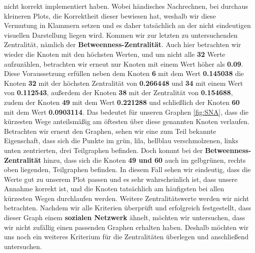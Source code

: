 nicht korrekt implementiert haben. Wobei händisches Nachrechnen, bei durchaus kleineren Plots, die Korrektheit dieser bewiesen hat, weshalb wir diese Vermutung in Klammern setzen und es daher tatsächlich an der nicht eindeutigen visuellen Darstellung liegen wird. Kommen wir zur letzten zu untersuchenden Zentralität, nämlich der \textbf{Betweenness-Zentralität}. Auch hier betrachten wir wieder die Knoten mit den höchsten Werten, und um nicht alle \textbf{32} Werte aufzuzählen, betrachten wir erneut nur Knoten mit einem Wert höher als \textbf{0.09}. Diese Voraussetzung erfüllen neben dem Knoten \textbf{6} mit dem Wert \textbf{0.145038} die Knoten \textbf{32} mit der höchsten Zentralität von \textbf{0.266448} und \textbf{34} mit einem Wert von \textbf{0.112543}, außerdem der Knoten \textbf{38} mit der Zentralität von \textbf{0.154688}, zudem der Knoten \textbf{49} mit dem Wert \textbf{0.221288} und schließlich der Knoten \textbf{60} mit dem Wert \textbf{0.0903114}. Das bedeutet für unseren Graphen \ref{fig:SNA}, dass die kürzesten Wege anteilsmäßig am öftesten über diese genannten Knoten verlaufen. Betrachten wir erneut den Graphen, sehen wir eine zum Teil bekannte Eigenschaft, dass sich die Punkte im grün, lila, hellblau verschmolzenen, links unten zentrierten, drei Teilgraphen befinden. Doch kommt bei der \textbf{Betweenness-Zentralität} hinzu, dass sich die Knoten \textbf{49 und 60} auch im gelbgrünen, rechts oben liegenden, Teilgraphen befinden. In diesem Fall sehen wir eindeutig, dass die Werte gut zu unserem Plot passen und es sehr wahrscheinlich ist, dass unsere Annahme korrekt ist, und die Knoten tatsächlich am häufigsten bei allen kürzesten Wegen durchlaufen werden. Weitere Zentralitätswerte werden wir nicht betrachten. Nachdem wir alle Kriterien überprüft und erfolgreich festgestellt, dass dieser Graph einem \textbf{sozialen Netzwerk} ähnelt, möchten wir untersuchen, dass wir nicht zufällig einen passenden Graphen erhalten haben. Deshalb möchten wir uns noch ein weiteres Kriterium für die Zentralitäten überlegen und anschließend untersuchen.


